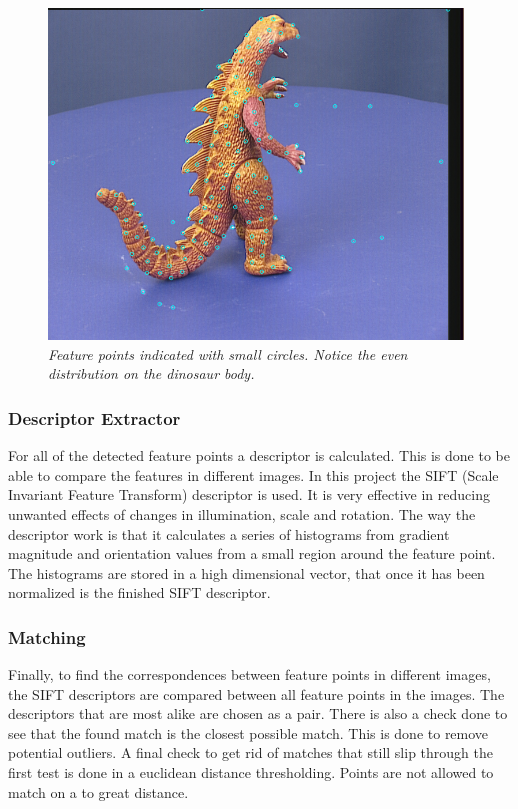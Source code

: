 \begin{figure}[htb]
	\centering
	\includegraphics[width=110mm]{images/FeatureDetection.png}
	\caption{\textit{Feature points indicated with small circles. Notice the even distribution on the dinosaur body.}}
	\label{fig:FeaturePoints} %
\end{figure}

\subsubsection{Descriptor Extractor}
For all of the detected feature points a descriptor is calculated. This is done to be able to compare the features in different images. In this project the SIFT (Scale Invariant Feature Transform) descriptor is used. It is very effective in reducing unwanted effects of changes in illumination, scale and rotation. The way the descriptor work is that it calculates a series of histograms from gradient magnitude and orientation values from a small region around the feature point. The histograms are stored in a high dimensional vector, that once it has been normalized is the finished SIFT descriptor.

\subsubsection{Matching}
Finally, to find the correspondences between feature points in different images, the SIFT descriptors are compared between all feature points in the images. The descriptors that are most alike are chosen as a pair. There is also a check done to see that the found match is the closest possible match. This is done to remove potential outliers. A final check to get rid of matches that still slip through the first test is done in a euclidean distance thresholding. Points are not allowed to match on a to great distance.

